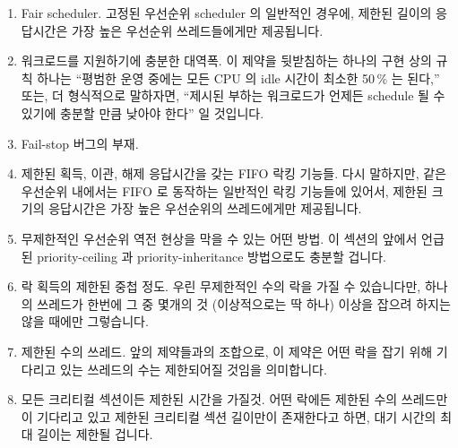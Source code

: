\begin{enumerate}
\item	Fair scheduler.
	고정된 우선순위 scheduler 의 일반적인 경우에, 제한된 길이의 응답시간은
	가장 높은 우선순위 쓰레드들에게만 제공됩니다.
\item	워크로드를 지원하기에 충분한 대역폭.
	이 제약을 뒷받침하는 하나의 구현 상의 규칙 하나는 ``평범한 운영 중에는
	모든 CPU 의 idle 시간이 최소한 50\,\% 는 된다,'' 또는, 더 형식적으로
	말하자면, ``제시된 부하는 워크로드가 언제든 schedule 될 수 있기에
	충분할 만큼 낮아야 한다'' 일 것입니다.
\item	Fail-stop 버그의 부재.
\item	제한된 획득, 이관, 해제 응답시간을 갖는 FIFO 락킹 기능들.
	다시 말하지만, 같은 우선순위 내에서는 FIFO 로 동작하는 일반적인 락킹
	기능들에 있어서, 제한된 크기의 응답시간은 가장 높은 우선순위의
	쓰레드에게만 제공됩니다.
\item	무제한적인 우선순위 역전 현상을 막을 수 있는 어떤 방법.
	이 섹션의 앞에서 언급된 priority-ceiling 과 priority-inheritance
	방법으로도 충분할 겁니다.
\item	락 획득의 제한된 중첩 정도.
	우린 무제한적인 수의 락을 가질 수 있습니다만, 하나의 쓰레드가 한번에 그
	중 몇개의 것 (이상적으로는 딱 하나) 이상을 잡으려 하지는 않을 때에만
	그렇습니다.
\item	제한된 수의 쓰레드.
	앞의 제약들과의 조합으로, 이 제약은 어떤 락을 잡기 위해 기다리고 있는
	쓰레드의 수는 제한되어질 것임을 의미합니다.
\item	모든 크리티컬 섹션이든 제한된 시간을 가질것.
	어떤 락에든 제한된 수의 쓰레드만이 기다리고 있고 제한된 크리티컬 섹션
	길이만이 존재한다고 하면, 대기 시간의 최대 길이는 제한될 겁니다.
\iffalse


\end{enumerate}
